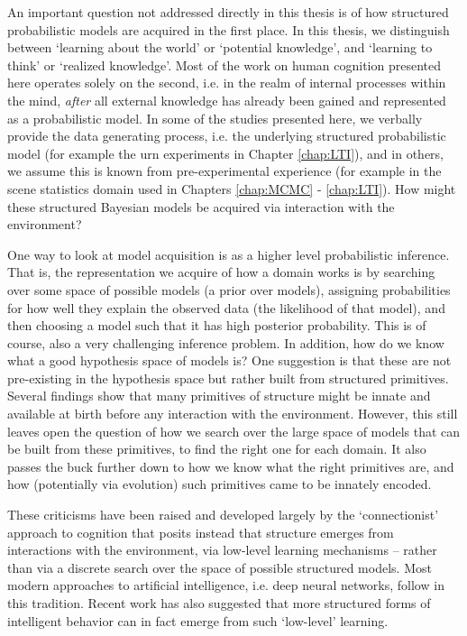 An important question not addressed directly in this thesis is of how structured probabilistic models are acquired in the first place. In this thesis, we distinguish between `learning about the world' or `potential knowledge', and `learning to think' or `realized knowledge'. Most of the work on human cognition presented here operates solely on the second, i.e. in the realm of internal processes within the mind, \textit{after} all external knowledge has already been gained and represented as a probabilistic model. In some of the studies presented here, we verbally provide the data generating process, i.e. the underlying structured probabilistic model (for example the urn experiments in Chapter \ref{chap:LTI}), and in others, we assume this is known from pre-experimental experience (for example in the scene statistics domain used in Chapters \ref{chap:MCMC} - \ref{chap:LTI}). How might these structured Bayesian models be acquired via interaction with the environment?

One way to look at model acquisition is as a higher level probabilistic inference. That is, the representation we acquire of how a domain works is by searching over some space of possible models (a prior over models), assigning probabilities for how well they explain the observed data (the likelihood of that model), and then choosing a model such that it has high posterior probability. This is of course, also a very challenging inference problem\citep{schulz2012finding, bramley2018grounding}. In addition, how do we know what a good hypothesis space of models is? One suggestion is that these are not pre-existing in the hypothesis space but rather built from structured primitives. Several findings show that many primitives of structure might be innate and available at birth before any interaction with the environment\citep{spelke1998nativism, chomsky1967recent}. However, this still leaves open the question of how we search over the large space of models that can be built from these primitives, to find the right one for each domain. It also passes the buck further down to how we know what the right primitives are, and how (potentially via evolution) such primitives came to be innately encoded. 


These criticisms have been raised and developed largely by the `connectionist' approach to cognition\citep{rogers2004semantic, mcclelland2010letting} that posits instead that structure emerges from interactions with the environment, via low-level learning mechanisms -- rather than via a discrete search over the space of possible structured models. Most modern approaches to artificial intelligence, i.e. deep neural networks, follow in this tradition. Recent work has also suggested that more structured forms of intelligent behavior can in fact emerge from such `low-level' learning\citep{dasgupta2019causal, wang2018, botvinick2019reinforcement}.

